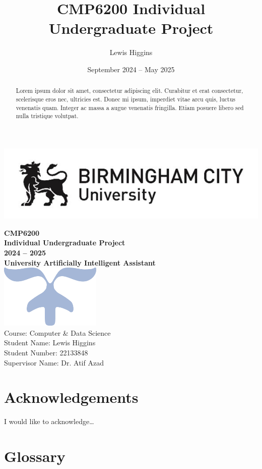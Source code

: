 \documentclass[12pt]{report}
\title{CMP6200 Individual Undergraduate Project}
\author{Lewis Higgins}
\date{September 2024 – May 2025}
\begin{document}
\makeatletter
\begin{titlepage}
    \includegraphics[width=0.3\linewidth]{BCUWide.jpg}\\[4ex]
    \vspace{1cm}
    \begin{center}
        {\huge \bfseries  CMP6200}\\[2ex]
        {\huge \bfseries  Individual Undergraduate Project}\\[2ex]
        {\huge \bfseries 2024 – 2025}\\[16ex]
        {\huge \bfseries University Artificially Intelligent Assistant}\\[6ex]
        \includegraphics[width=0.1\linewidth]{Symbol.png}\\[40ex]
        Course: Computer \& Data Science\\
        Student Name: Lewis Higgins\\
        Student Number: 22133848\\
        Supervisor Name: Dr. Atif Azad
    \end{center}
\end{titlepage}
\makeatother
\thispagestyle{empty}
\newpage



\begin{abstract}
    Lorem ipsum dolor sit amet, consectetur adipiscing elit. Curabitur et erat consectetur, 
    scelerisque eros nec, ultricies est. Donec mi ipsum, imperdiet vitae arcu quis, luctus venenatis quam. 
    Integer ac massa a augue venenatis fringilla. Etiam posuere libero sed nulla tristique volutpat.
\end{abstract}

\setcounter{page}{0}

\chapter*{Acknowledgements}
I would like to acknowledge\dots

\tableofcontents

\chapter*{Glossary}
\end{document}
